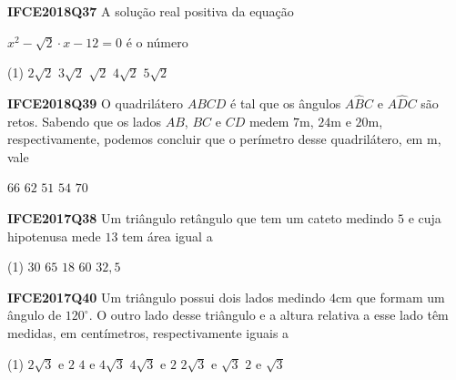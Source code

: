 \documentclass[10pt]{article}
\begin{document}
\begin{multicols}{2}
\setlength\columnseprule{1pt}
\def\columnseprulecolor{\color{corlinha}}%

\begin{question}[name = Questão]
\textbf{IFCE2018Q37}
A solução real positiva da equação 

\noindent\( x^2 - \sqrt{2} \cdot x - 12 = 0 \) é o número

\begin{tasks}(1)
        \task \( 2\sqrt{2} \)
        \task \( 3\sqrt{2} \)
        \task \( \sqrt{2} \)
        \task \( 4\sqrt{2} \)
        \task \( 5\sqrt{2} \)
    \end{tasks}
\end{question}

\begin{question}[name = Questão]
\textbf{IFCE2018Q39}
O quadrilátero \( ABCD \) é tal que os ângulos \( A\widehat{B}C\) e \( A\widehat{D}C\) são retos. Sabendo que os lados \( AB \), \( BC \) e \( CD \) medem \( 7\mathrm{m} \), \( 24\mathrm{m} \) e \( 20\mathrm{m} \), respectivamente, podemos concluir que o perímetro desse quadrilátero, em \(\mathrm{m} \), vale

\begin{tasks}
        \task \( 66 \)
        \task \( 62 \)
        \task \( 51 \)
        \task \( 54 \)
        \task \( 70 \)
    \end{tasks}
\end{question}

\begin{question}[name = Questão]
\textbf{IFCE2017Q38}
Um triângulo retângulo que tem um cateto medindo \( 5 \) e cuja hipotenusa mede \( 13 \) tem área igual a

\begin{tasks}(1)
        \task \( 30 \)
        \task \( 65 \)
        \task \( 18 \)
        \task \( 60 \)
        \task \( 32,5 \)
    \end{tasks}
\end{question}

\begin{question}[name = Questão]
\textbf{IFCE2017Q40}
Um triângulo possui dois lados medindo \( 4 \mathrm{cm}\) que formam um ângulo de \( 120^\circ \). O outro lado desse triângulo e a altura relativa a esse lado têm medidas, em centímetros, respectivamente iguais a

\begin{tasks}(1)
        \task \( 2\sqrt{3} \) e \( 2 \)  
        \task \( 4 \) e \( 4\sqrt{3} \)  
        \task \( 4\sqrt{3} \) e \( 2 \)  
        \task \( 2\sqrt{3} \) e \( \sqrt{3} \)  
        \task \( 2 \) e \( \sqrt{3} \)  
    \end{tasks}
\end{question}

\end{multicols}
\end{document}
